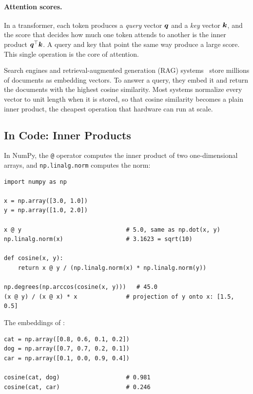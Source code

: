 \paragraph{Attention scores.}
In a transformer, each token produces a \emph{query} vector $\bm{q}$
and a \emph{key} vector $\bm{k}$, and the score that decides how much
one token attends to another is the inner product $\bm{q}^\top
\bm{k}$. A query and key that point the same way produce a large score.
This single operation is the core of attention.

\begin{aibox}
  Search engines and retrieval-augmented generation (RAG)
  systems~\cite{lewis2020rag} store
  millions of documents as embedding vectors. To answer a query, they embed
  it and return the documents with the highest cosine similarity. Most
  systems normalize every vector to unit length when it is stored, so that
  cosine similarity becomes a plain inner product, the cheapest operation
  that hardware can run at scale.
\end{aibox}

\subsection{In Code: Inner Products}
\label{sec:ch03-inner-code}

In NumPy, the \texttt{@} operator computes the inner product of two
one-dimensional arrays, and \texttt{np.linalg.norm} computes the norm:

\begin{lstlisting}
import numpy as np

x = np.array([3.0, 1.0])
y = np.array([1.0, 2.0])

x @ y                              # 5.0, same as np.dot(x, y)
np.linalg.norm(x)                  # 3.1623 = sqrt(10)

def cosine(x, y):
    return x @ y / (np.linalg.norm(x) * np.linalg.norm(y))

np.degrees(np.arccos(cosine(x, y)))   # 45.0
(x @ y) / (x @ x) * x              # projection of y onto x: [1.5, 0.5]
\end{lstlisting}

The embeddings of :

\begin{lstlisting}
cat = np.array([0.8, 0.6, 0.1, 0.2])
dog = np.array([0.7, 0.7, 0.2, 0.1])
car = np.array([0.1, 0.0, 0.9, 0.4])

cosine(cat, dog)                   # 0.981
cosine(cat, car)                   # 0.246
\end{lstlisting}


